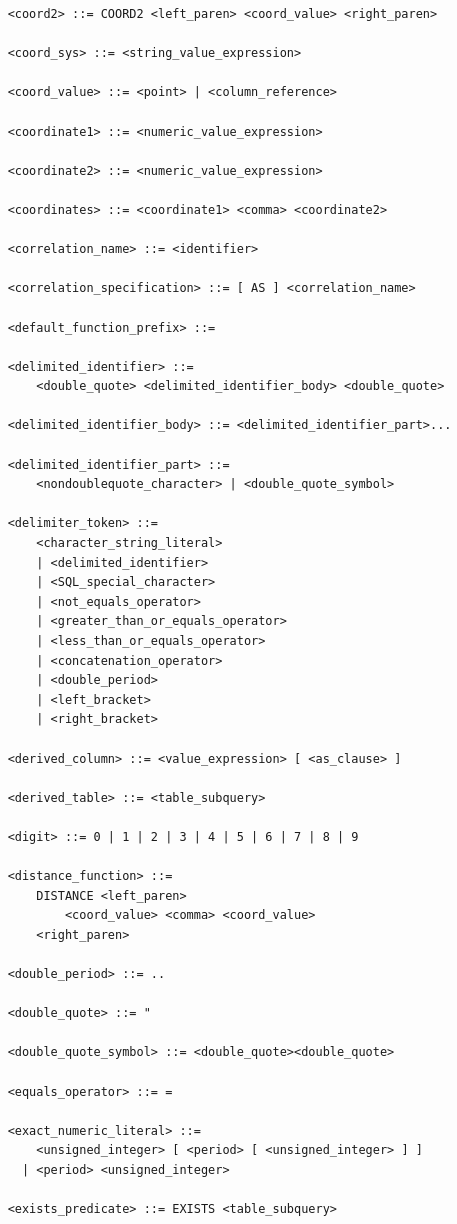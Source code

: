 \documentclass[11pt,a4paper]{ivoa}
\begin{document}
\begin{verbatim}
    <coord2> ::= COORD2 <left_paren> <coord_value> <right_paren>

    <coord_sys> ::= <string_value_expression>

    <coord_value> ::= <point> | <column_reference>

    <coordinate1> ::= <numeric_value_expression>

    <coordinate2> ::= <numeric_value_expression>

    <coordinates> ::= <coordinate1> <comma> <coordinate2>

    <correlation_name> ::= <identifier>

    <correlation_specification> ::= [ AS ] <correlation_name>

    <default_function_prefix> ::=

    <delimited_identifier> ::=
        <double_quote> <delimited_identifier_body> <double_quote>

    <delimited_identifier_body> ::= <delimited_identifier_part>...

    <delimited_identifier_part> ::=
        <nondoublequote_character> | <double_quote_symbol>

    <delimiter_token> ::=
        <character_string_literal>
        | <delimited_identifier>
        | <SQL_special_character>
        | <not_equals_operator>
        | <greater_than_or_equals_operator>
        | <less_than_or_equals_operator>
        | <concatenation_operator>
        | <double_period>
        | <left_bracket>
        | <right_bracket>

    <derived_column> ::= <value_expression> [ <as_clause> ]

    <derived_table> ::= <table_subquery>

    <digit> ::= 0 | 1 | 2 | 3 | 4 | 5 | 6 | 7 | 8 | 9

    <distance_function> ::=
        DISTANCE <left_paren>
            <coord_value> <comma> <coord_value>
        <right_paren>

    <double_period> ::= ..

    <double_quote> ::= "

    <double_quote_symbol> ::= <double_quote><double_quote>

    <equals_operator> ::= =

    <exact_numeric_literal> ::=
        <unsigned_integer> [ <period> [ <unsigned_integer> ] ]
      | <period> <unsigned_integer>

    <exists_predicate> ::= EXISTS <table_subquery>


\end{verbatim}
\end{document}
